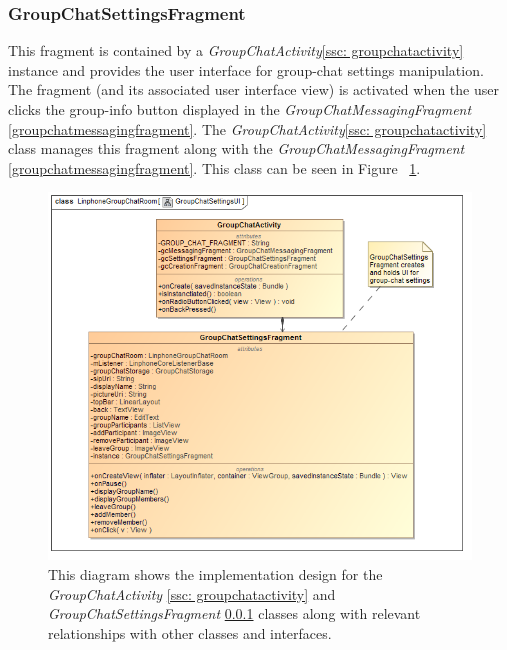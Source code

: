 \documentclass[11pt]{article}
\begin{document}
\subsubsection{GroupChatSettingsFragment}\label{groupchatsettingsfragment}
This fragment is contained by a \textit{GroupChatActivity}\ref{ssc: groupchatactivity} instance and provides the user interface for group-chat settings manipulation. The fragment (and its associated user interface view) is activated when the user clicks the group-info button displayed in the \textit{GroupChatMessagingFragment} \ref{groupchatmessagingfragment}. The \textit{GroupChatActivity}\ref{ssc: groupchatactivity} class manages this fragment along with the \textit{GroupChatMessagingFragment} \ref{groupchatmessagingfragment}. This class can be seen in Figure ~\ref{cd-group-chat-settings-ui}.
\begin{figure}[H]
\centering
\includegraphics[width=5in]{./images/class_group_chat_settings_ui.png}
\caption[Android Group Chat Settings UI Class Diagram]{This diagram shows the implementation design for the \textit{GroupChatActivity} \ref{ssc: groupchatactivity} and \textit{GroupChatSettingsFragment} \ref{groupchatsettingsfragment} classes along with relevant relationships with other classes and interfaces.}
\label{cd-group-chat-settings-ui}
\end{figure}
\end{document}
